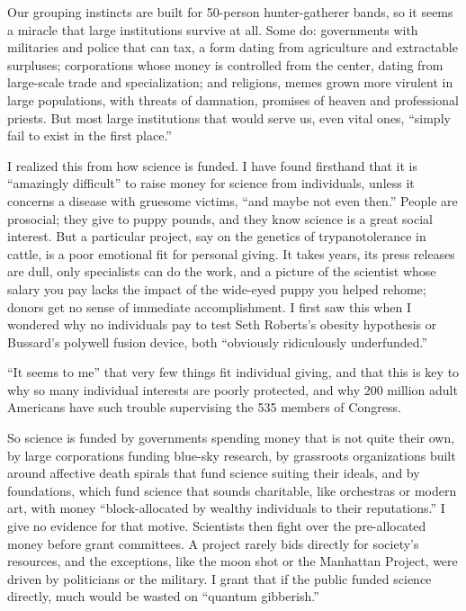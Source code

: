
Our grouping instincts are built for 50-person hunter-gatherer bands, so it seems a miracle that large institutions survive at all. Some do: governments with militaries and police that can tax, a form dating from agriculture and extractable surpluses; corporations whose money is controlled from the center, dating from large-scale trade and specialization; and religions, memes grown more virulent in large populations, with threats of damnation, promises of heaven and professional priests. But most large institutions that would serve us, even vital ones, ``simply fail to exist in the first place.'' 

I realized this from how science is funded. I have found firsthand that it is ``amazingly difficult'' to raise money for science from individuals, unless it concerns a disease with gruesome victims, ``and maybe not even then.''  People are prosocial; they give to puppy pounds, and they know science is a great social interest. But a particular project, say on the genetics of trypanotolerance in cattle, is a poor emotional fit for personal giving. It takes years, its press releases are dull, only specialists can do the work, and a picture of the scientist whose salary you pay lacks the impact of the wide-eyed puppy you helped rehome; donors get no sense of immediate accomplishment. I first saw this when I wondered why no individuals pay to test Seth Roberts's obesity hypothesis or Bussard's polywell fusion device, both ``obviously ridiculously underfunded.'' 

``It seems to me'' that very few things fit individual giving, and that this is key to why so many individual interests are poorly protected, and why 200 million adult Americans have such trouble supervising the 535 members of Congress.

So science is funded by governments spending money that is not quite their own, by large corporations funding blue-sky research, by grassroots organizations built around affective death spirals that fund science suiting their ideals, and by foundations, which fund science that sounds charitable, like orchestras or modern art, with money ``block-allocated by wealthy individuals to their reputations.'' I give no evidence for that motive. Scientists then fight over the pre-allocated money before grant committees. A project rarely bids directly for society's resources, and the exceptions, like the moon shot or the Manhattan Project, were driven by politicians or the military. I grant that if the public funded science directly, much would be wasted on ``quantum gibberish.''

